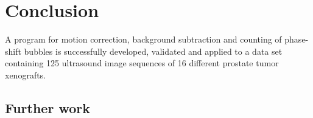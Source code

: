 
\section{Conclusion}
A program for motion correction, background subtraction and counting of phase-shift bubbles is successfully developed, validated and applied to a data set containing 125 ultrasound image sequences of 16 different prostate tumor xenografts.   
\subsection{Further work}
